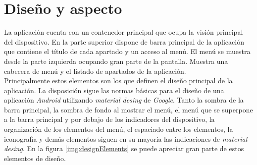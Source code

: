 \documentclass[../PFC.tex]{subfiles}
\begin{document}
\begin{usecase}


\end{usecase}

\section{Diseño y aspecto}
\label{App:Diseño y aspecto}

La aplicación cuenta con un contenedor principal que ocupa la visión principal del dispositivo. En la parte superior dispone de barra principal de la aplicación que contiene el título de cada apartado y un acceso al menú. El menú se muestra desde la parte izquierda ocupando gran parte de la pantalla. Muestra una cabecera de menú y el listado de apartados de la aplicación.
\*
\vspace{0.5515cm}
\\
Principalmente estos elementos son los que definen el diseño principal de la aplicación. La disposición sigue las normas básicas para el diseño de una aplicación \textit{Android} utilizando \textit{material desing} de \textit{Google}\cite{materialDesign}. Tanto la sombra de la barra principal, la sombra de fondo al mostrar el menú, el menú que se superpone a la barra principal y por debajo de los indicadores del dispositivo, la organización de los elementos del menú, el espaciado entre los elementos, la iconografía y demás elementos siguen en su mayoría las indicaciones de \textit{material desing}. En la figura \ref{img:designElements} se puede apreciar gran parte de estos elementos de diseño.
\end{document}

